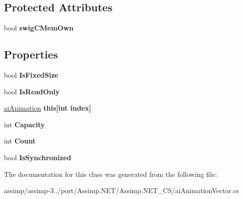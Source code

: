 \subsection*{Protected Attributes}
\begin{DoxyCompactItemize}
\item 
\hypertarget{classai_animation_vector_a041cbcfac10d4bdbf2e3940a2d49884a}{bool {\bfseries swig\+C\+Mem\+Own}}\label{classai_animation_vector_a041cbcfac10d4bdbf2e3940a2d49884a}

\end{DoxyCompactItemize}
\subsection*{Properties}
\begin{DoxyCompactItemize}
\item 
\hypertarget{classai_animation_vector_a04bc4fda6fb4603dad067c392fe54204}{bool {\bfseries Is\+Fixed\+Size}}\label{classai_animation_vector_a04bc4fda6fb4603dad067c392fe54204}

\item 
\hypertarget{classai_animation_vector_a97e321346d8359c41ff196d790879646}{bool {\bfseries Is\+Read\+Only}}\label{classai_animation_vector_a97e321346d8359c41ff196d790879646}

\item 
\hypertarget{classai_animation_vector_acc78dbf7025d8a7cb951a1351b04b9dc}{\hyperlink{structai_animation}{ai\+Animation} {\bfseries this\mbox{[}int index\mbox{]}}}\label{classai_animation_vector_acc78dbf7025d8a7cb951a1351b04b9dc}

\item 
\hypertarget{classai_animation_vector_aa7e304022a7b4bf469279c54876a5ea8}{int {\bfseries Capacity}}\label{classai_animation_vector_aa7e304022a7b4bf469279c54876a5ea8}

\item 
\hypertarget{classai_animation_vector_abca15786f7b03e079f1f720e357dea84}{int {\bfseries Count}}\label{classai_animation_vector_abca15786f7b03e079f1f720e357dea84}

\item 
\hypertarget{classai_animation_vector_ae8bb757cc422469d5544e32d9ce61c03}{bool {\bfseries Is\+Synchronized}}\label{classai_animation_vector_ae8bb757cc422469d5544e32d9ce61c03}

\end{DoxyCompactItemize}


The documentation for this class was generated from the following file\+:\begin{DoxyCompactItemize}
\item 
assimp/assimp-\/3../port/\+Assimp.\+N\+E\+T/\+Assimp.\+N\+E\+T\+\_\+\+C\+S/ai\+Animation\+Vector.\+cs\end{DoxyCompactItemize}
